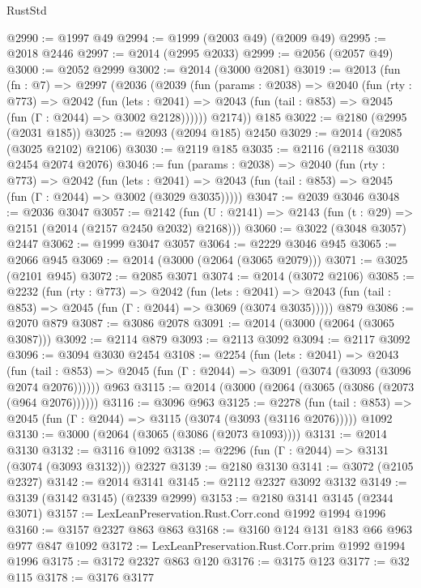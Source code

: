 \begin{lexlean}{RustStd}
\begin{coremodule}
@2990 := @1997 @49
@2994 := @1999 (@2003 @49) (@2009 @49)
@2995 := @2018 @2446
@2997 := @2014 (@2995 @2033)
@2999 := @2056 (@2057 @49)
@3000 := @2052 @2999
@3002 := @2014 (@3000 @2081)
@3019 := @2013
    (fun (fn : @7) =>
    @2997
      (@2036
        (@2039
          (fun (params : @2038) =>
          @2040
            (fun (rty : @773) =>
            @2042
              (fun (lets : @2041) =>
              @2043 (fun (tail : @853) => @2045 (fun (Γ : @2044) => @3002 @2128))))))
        @2174))
    @185
@3022 := @2180 (@2995 (@2031 @185))
@3025 := @2093 (@2094 @185) @2450
@3029 := @2014 (@2085 (@3025 @2102) @2106)
@3030 := @2119 @185
@3035 := @2116 (@2118 @3030 @2454 @2074 @2076)
@3046 := fun (params : @2038) =>
  @2040
    (fun (rty : @773) =>
    @2042
      (fun (lets : @2041) =>
      @2043 (fun (tail : @853) => @2045 (fun (Γ : @2044) => @3002 (@3029 @3035)))))
@3047 := @2039 @3046
@3048 := @2036 @3047
@3057 := @2142 (fun (U : @2141) => @2143 (fun (t : @29) => @2151 (@2014 (@2157 @2450 @2032) @2168)))
@3060 := @3022 (@3048 @3057) @2447
@3062 := @1999 @3047 @3057
@3064 := @2229 @3046 @945
@3065 := @2066 @945
@3069 := @2014 (@3000 (@2064 (@3065 @2079)))
@3071 := @3025 (@2101 @945)
@3072 := @2085 @3071
@3074 := @2014 (@3072 @2106)
@3085 := @2232
    (fun (rty : @773) =>
    @2042
      (fun (lets : @2041) =>
      @2043 (fun (tail : @853) => @2045 (fun (Γ : @2044) => @3069 (@3074 @3035)))))
    @879
@3086 := @2070 @879
@3087 := @3086 @2078
@3091 := @2014 (@3000 (@2064 (@3065 @3087)))
@3092 := @2114 @879
@3093 := @2113 @3092
@3094 := @2117 @3092
@3096 := @3094 @3030 @2454
@3108 := @2254
    (fun (lets : @2041) =>
    @2043
      (fun (tail : @853) => @2045 (fun (Γ : @2044) => @3091 (@3074 (@3093 (@3096 @2074 @2076))))))
    @963
@3115 := @2014 (@3000 (@2064 (@3065 (@3086 (@2073 (@964 @2076))))))
@3116 := @3096 @963
@3125 := @2278
    (fun (tail : @853) => @2045 (fun (Γ : @2044) => @3115 (@3074 (@3093 (@3116 @2076)))))
    @1092
@3130 := @3000 (@2064 (@3065 (@3086 (@2073 @1093))))
@3131 := @2014 @3130
@3132 := @3116 @1092
@3138 := @2296 (fun (Γ : @2044) => @3131 (@3074 (@3093 @3132))) @2327
@3139 := @2180 @3130
@3141 := @3072 (@2105 @2327)
@3142 := @2014 @3141
@3145 := @2112 @2327 @3092 @3132
@3149 := @3139 (@3142 @3145) (@2339 @2999)
@3153 := @2180 @3141 @3145 (@2344 @3071)
@3157 := LexLeanPreservation.Rust.Corr.cond @1992 @1994 @1996
@3160 := @3157 @2327 @863 @863
@3168 := @3160 @124 @131 @183 @66 @963 @977 @847 @1092
@3172 := LexLeanPreservation.Rust.Corr.prim @1992 @1994 @1996
@3175 := @3172 @2327 @863 @120
@3176 := @3175 @123
@3177 := @32 @115
@3178 := @3176 @3177

\end{coremodule}
\end{lexlean}
